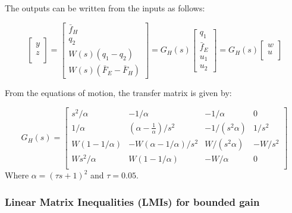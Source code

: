 \documentclass{article}
\begin{document}
The outputs can be written from the inputs as follows:

\begin{equation}
    \begin{bmatrix}
        y \\
        z \\
    \end{bmatrix} = \begin{bmatrix}
        \bar{f}_H \\
        q_2 \\
        W(s)(q_1 - q_2) \\
        W(s)(\bar{F}_E - \bar{F}_H)
    \end{bmatrix} = G_H(s) \begin{bmatrix}
        q_1 \\
        \bar{f}_E \\
        u_1 \\
        u_2
    \end{bmatrix} = G_H(s) \begin{bmatrix}
        w \\
        u \\
    \end{bmatrix}
\end{equation}

From the equations of motion, the transfer matrix is given by:

\begin{equation}
    G_H(s) = \begin{bmatrix}
        s^2/\alpha & -1/\alpha & -1/\alpha & 0 \\
        1/\alpha & \left(\alpha - \frac{1}{\alpha}\right)/s^2 & - 1/(s^2 \alpha) & 1/s^2 \\
        W\left(1 - 1/\alpha \right) & - W\left( \alpha- 1/\alpha \right)/s^2 & W / (s^2 \alpha) & - W/s^2 \\
        W s^2 / \alpha & W(1 - 1/\alpha) & - W/\alpha & 0 \\
    \end{bmatrix}
\end{equation}
Where $\alpha = (\tau s + 1)^2$ and $\tau = 0.05$.

\subsubsection{Linear Matrix Inequalities (LMIs) for bounded gain}
\end{document}
